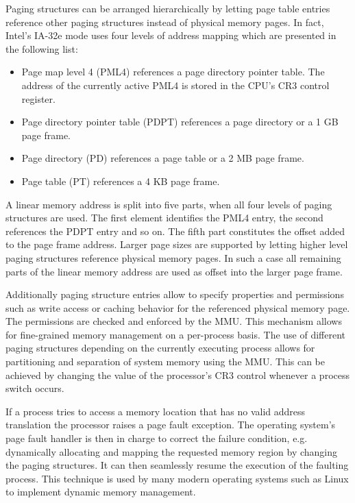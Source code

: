 Paging structures can be arranged hierarchically by letting page table entries
reference other paging structures instead of physical memory pages. In fact,
Intel's IA-32e mode uses four levels of address mapping which are presented in
the following list:

\begin{itemize}
	\item Page map level 4 (PML4) references a page directory pointer table. The
		address of the currently active PML4 is stored in the CPU's CR3 control
		register.
	\item Page directory pointer table (PDPT) references a page directory or a 1
		GB page frame.
	\item Page directory (PD) references a page table or a 2 MB page frame.
	\item Page table (PT) references a 4 KB page frame.
\end{itemize}

A linear memory address is split into five parts, when all four levels of paging
structures are used. The first element identifies the PML4 entry, the second
references the PDPT entry and so on. The fifth part constitutes the offset added
to the page frame address. Larger page sizes are supported by letting higher
level paging structures reference physical memory pages. In such a case all
remaining parts of the linear memory address are used as offset into the larger
page frame.

Additionally paging structure entries allow to specify properties and
permissions such as write access or caching behavior for the referenced physical
memory page. The permissions are checked and enforced by the MMU. This mechanism
allows for fine-grained memory management on a per-process basis. The use of
different paging structures depending on the currently executing process allows
for partitioning and separation of system memory using the MMU. This can be
achieved by changing the value of the processor's CR3 control whenever a process
switch occurs.

If a process tries to access a memory location that has no valid address
translation the processor raises a page fault exception. The operating system's
page fault handler is then in charge to correct the failure condition, e.g.
dynamically allocating and mapping the requested memory region by changing the
paging structures. It can then seamlessly resume the execution of the faulting
process. This technique is used by many modern operating systems such as Linux
to implement dynamic memory management.

